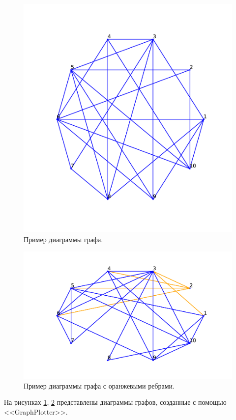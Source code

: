 \begin{figure}[H] 
    \includegraphics[scale=0.5]{g1.pdf}
    \caption{Пример диаграммы графа.}
    \label{gexp_1}
\end{figure} 
\begin{figure}[H] 
    \includegraphics[scale=0.5]{g2.pdf}
    \caption{Пример диаграммы графа с оранжевыми ребрами.}
    \label{gexp_2}
\end{figure} 
На рисунках \ref{gexp_1}, \ref{gexp_2}
представлены диаграммы графов, созданные с помощью
<<GraphPlotter>>.
